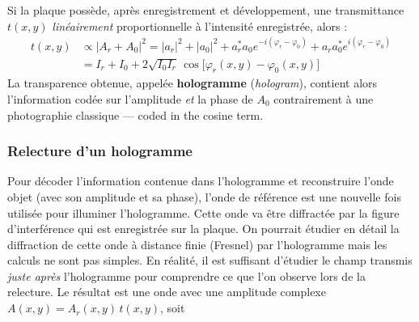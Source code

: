 \begin{definition}[Hologramme]
  Si la plaque possède, après enregistrement et développement, une transmittance
  $t(x,y)$ \emph{linéairement} proportionnelle à l'intensité enregistrée, alors :
  \begin{equation*}
    \boxed{\;\begin{aligned}
      t(x,y) &\propto |A_r+A_0|^2
      = |a_r|^2+|a_0|^2 + a_r^{*}a_0 e^{-i(\varphi_r-\varphi_0)}
      + a_r a_0^{*}e^{i(\varphi_r-\varphi_0)}\\
      &= I_r + I_0 + 2\sqrt{I_0 I_r}\,
        \cos\!\big[\varphi_r(x,y)-\varphi_0(x,y)\big]
    \end{aligned}\;}
  \end{equation*}
  La transparence obtenue, appelée \textbf{hologramme} (\textit{hologram}),
  contient alors l'information codée sur l'amplitude \emph{et} la phase de $A_0$
  contrairement à une photographie classique --- coded in the cosine term.
\end{definition}

\begin{figure}[h!]
  \centering
\end{figure}

\subsubsection{Relecture d'un hologramme}
Pour décoder l'information contenue dans l'hologramme et reconstruire l'onde
objet (avec son amplitude et sa phase), l'onde de référence est une nouvelle fois
utilisée pour illuminer l'hologramme. Cette onde va être diffractée par la figure
d'interférence qui est enregistrée sur la plaque. On pourrait étudier en détail
la diffraction de cette onde à distance finie (Fresnel) par l'hologramme mais les
calculs ne sont pas simples. En réalité, il est suffisant d'étudier le champ
transmis \emph{juste après} l'hologramme pour comprendre ce que l'on observe lors
de la relecture. Le résultat est une onde avec une amplitude complexe
$A(x,y) = A_r(x,y)\,t(x,y)$, soit

